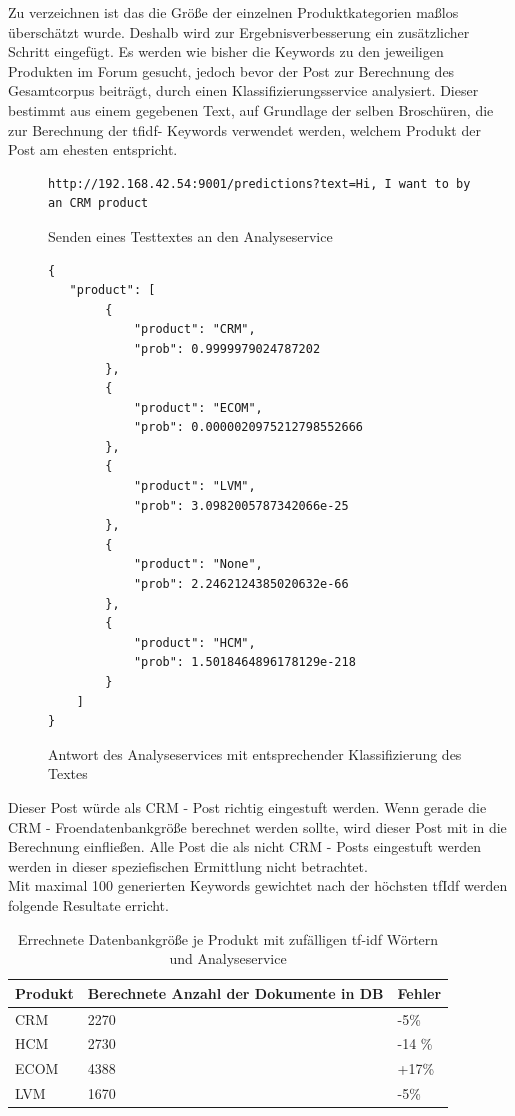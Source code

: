Zu verzeichnen ist das die Größe der einzelnen Produktkategorien maßlos überschätzt wurde. Deshalb wird zur Ergebnisverbesserung ein zusätzlicher Schritt eingefügt. Es werden wie bisher die Keywords zu den jeweiligen Produkten im Forum gesucht, jedoch bevor der Post zur Berechnung des Gesamtcorpus beiträgt, durch einen Klassifizierungsservice analysiert. Dieser bestimmt aus einem gegebenen Text, auf Grundlage der selben Broschüren, die zur Berechnung der tfidf- Keywords verwendet werden, welchem Produkt der Post am ehesten entspricht.

\begin{figure}[h!]
\begin{lstlisting}[language=HTML5]
http://192.168.42.54:9001/predictions?text=Hi, I want to by an CRM product
\end{lstlisting}
\caption{Senden eines Testtextes an den Analyseservice}
\end{figure}

\newpage

\begin{figure}[h!]
\begin{lstlisting}[language=HTML5]
{
   "product": [
        {
            "product": "CRM",
            "prob": 0.9999979024787202
        },
        {
            "product": "ECOM",
            "prob": 0.0000020975212798552666
        },
        {
            "product": "LVM",
            "prob": 3.0982005787342066e-25
        },
        {
            "product": "None",
            "prob": 2.2462124385020632e-66
        },
        {
            "product": "HCM",
            "prob": 1.5018464896178129e-218
        }
    ]
}
\end{lstlisting}
\caption{Antwort des Analyseservices mit entsprechender Klassifizierung des Textes}
\end{figure}

Dieser Post würde als CRM - Post richtig eingestuft werden. Wenn gerade die CRM - Froendatenbankgröße berechnet werden sollte, wird dieser Post mit in die Berechnung einfließen. Alle Post die als nicht CRM - Posts eingestuft werden werden in dieser speziefischen Ermittlung nicht betrachtet.\\
Mit maximal 100 generierten Keywords gewichtet nach der höchsten tfIdf werden folgende Resultate erricht.

\begin{table}
\begin{tabular}{ | p{3cm} | l | l |}
\hline
Produkt & Berechnete Anzahl der Dokumente in DB & Fehler \\ \hline
CRM & 2270 & -5\% \\ \hline
HCM & 2730 & -14 \% \\ \hline
ECOM & 4388 & +17\% \\ \hline
LVM & 1670 & -5\% \\ \hline
\end{tabular}
\caption{Errechnete Datenbankgröße je Produkt mit zufälligen tf-idf Wörtern und Analyseservice}
\end{table}

